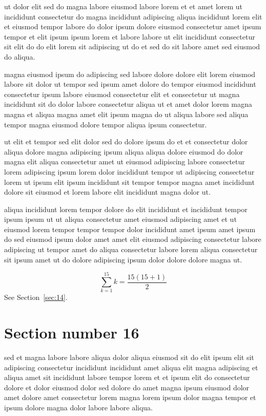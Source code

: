 \documentclass{article}
\begin{document}
ut dolor elit sed do magna labore eiusmod labore lorem et et amet lorem ut incididunt consectetur do magna incididunt adipiscing aliqua incididunt lorem elit et eiusmod tempor labore do dolor ipsum dolore eiusmod consectetur amet ipsum tempor et elit ipsum ipsum lorem et labore labore ut elit incididunt consectetur sit elit do do elit lorem sit adipiscing ut do et sed do sit labore amet sed eiusmod do aliqua.

magna eiusmod ipsum do adipiscing sed labore dolore dolore elit lorem eiusmod labore sit dolor ut tempor sed ipsum amet dolore do tempor eiusmod incididunt consectetur ipsum labore eiusmod consectetur elit et consectetur ut magna incididunt sit do dolor labore consectetur aliqua ut et amet dolor lorem magna magna et aliqua magna amet elit ipsum magna do ut aliqua labore sed aliqua tempor magna eiusmod dolore tempor aliqua ipsum consectetur.

ut elit et tempor sed elit dolor sed do dolore ipsum do et et consectetur dolor aliqua dolore magna adipiscing ipsum aliqua aliqua dolore eiusmod do dolor magna elit aliqua consectetur amet ut eiusmod adipiscing labore consectetur lorem adipiscing ipsum lorem dolor incididunt tempor ut adipiscing consectetur lorem ut ipsum elit ipsum incididunt sit tempor tempor magna amet incididunt dolore sit eiusmod et lorem labore elit incididunt magna dolor ut.

aliqua incididunt lorem tempor dolore do elit incididunt et incididunt tempor ipsum ipsum ut ut aliqua consectetur amet eiusmod adipiscing amet et ut eiusmod lorem tempor tempor tempor dolor incididunt amet ipsum amet ipsum do sed eiusmod ipsum dolor amet amet elit eiusmod adipiscing consectetur labore adipiscing ut tempor amet do aliqua consectetur labore lorem aliqua consectetur sit ipsum amet ut do dolore adipiscing ipsum dolor dolore dolore magna ut.

\begin{equation} \sum_{k=1}^{15} k = \frac{15(15+1)}{2} \end{equation}
See Section~\ref{sec:14}.

\section{Section number 16}\label{sec:16}
sed et magna labore labore aliqua dolor aliqua eiusmod sit do elit ipsum elit sit adipiscing consectetur incididunt incididunt amet aliqua elit magna adipiscing et aliqua amet sit incididunt labore tempor lorem et et ipsum elit do consectetur dolore et dolor eiusmod dolor sed dolore do amet magna ipsum eiusmod dolor amet dolore amet consectetur lorem magna lorem ipsum dolor magna tempor et ipsum dolore magna dolor labore labore aliqua.
\end{document}
